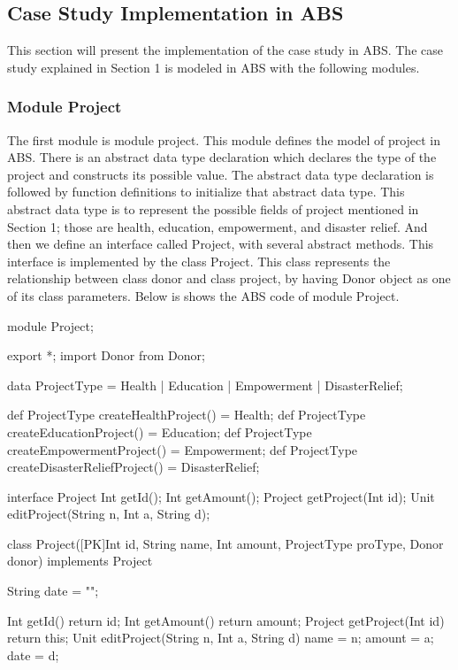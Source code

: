\documentclass[runningheads,a4paper]{llncs}
\begin{document}
\subsection{Case Study Implementation in ABS}
This section will present the implementation of the case study in ABS.  The case study explained in Section 1 is modeled in ABS with the following modules.

\subsubsection{Module Project}
The first module is module project. This module defines the model of project in ABS. There is an abstract data type declaration which declares the type of the project and constructs its possible value. The abstract data type declaration is followed by function definitions to initialize that abstract data type. This abstract data type is to represent the possible fields of project mentioned in Section 1; those are health, education, empowerment, and disaster relief. And then we define an interface called Project, with several abstract methods. This interface is implemented by the class Project. This class represents the relationship between class donor and class project, by having Donor object as one of its class parameters. Below is shows the ABS code of module Project.

\begin{abscode}
	module Project;
	
	export *;
	import Donor from Donor;
	
	data ProjectType = Health | Education | Empowerment | DisasterRelief;
	
	def ProjectType createHealthProject() = Health;
	def ProjectType createEducationProject() = Education;
	def ProjectType createEmpowermentProject() = Empowerment;
	def ProjectType createDisasterReliefProject() = DisasterRelief; 
	
	interface Project {
		Int getId();
		Int getAmount();
		Project getProject(Int id);
		Unit editProject(String n, Int a, String d);
	}
	
	class Project([PK]Int id, String name, Int amount, ProjectType proType, Donor donor) 
	implements Project {
		
		String date = "";
		
		Int getId() { return id; }
		Int getAmount() { return amount; }
		Project getProject(Int id){ return this; }
		Unit editProject(String n, Int a, String d) {
			name = n;
			amount = a;
			date = d;
		}	
	}
\end{abscode}
\end{document}
